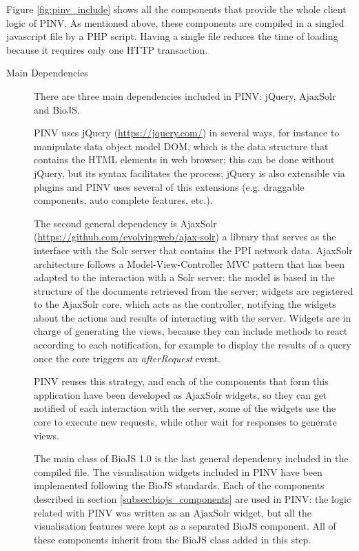 Figure \ref{fig:pinv_include} shows all the components that provide the whole client logic of PINV. As mentioned above, these components are compiled in a singled javascript file by a PHP script. Having a single file reduces the time of loading because it requires only one HTTP transaction. 
\begin{description}
\item[Main Dependencies] 
There are three main dependencies included in PINV: jQuery, AjaxSolr and BioJS. 

PINV uses jQuery (\url{https://jquery.com/}) in several ways, for instance to manipulate data object model DOM, which is the data structure that contains the HTML elements in web browser; this can be done without jQuery, but its syntax facilitates the process; jQuery is also extensible via plugins and PINV uses several of this extensions (e.g. draggable components, auto complete features, etc.).

The second general dependency is AjaxSolr (\url{https://github.com/evolvingweb/ajax-solr}) a library that serves as the interface with the Solr server that contains the PPI network data. AjaxSolr architecture follows a Model-View-Controller MVC pattern that has been adapted to the interaction with a Solr server: the model is based in the structure of the documents retrieved from the server; widgets are registered to the AjaxSolr core, which acts as the controller, notifying the widgets about the actions and results of interacting with the server. Widgets are in charge of generating the views, because they can include methods to react according to each notification, for example to display the results of a query once the core triggers an \emph{afterRequest} event. 

PINV reuses this strategy, and each of the components that form this application have been developed as AjaxSolr widgets, so they can get notified of each interaction with the server, some of the widgets use the core to execute new requests, while other wait for responses to generate views.

The main class of BioJS 1.0 is the last general dependency included in the compiled file. The visualisation widgets included in PINV have been implemented following the BioJS standards. Each of the components described in section \ref{subsec:biojs_components} are used in PINV: the logic related with PINV was written as an AjaxSolr widget, but all the visualisation features were kept as a separated BioJS component. All of these components inherit from the BioJS class added in this step.


\end{description}
